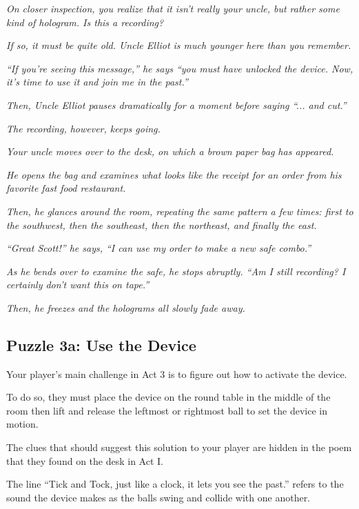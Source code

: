 \documentclass[a6paper, parskip=half, DIV=14, 12pt]{scrartcl}
\begin{document}
\textit{On closer inspection, you realize that it isn't really your uncle, but rather some kind of hologram. Is this a recording?}

\textit{If so, it must be quite old. Uncle Elliot is much younger here than you remember.}

\textit{``If you're seeing this message,'' he says ``you must have unlocked the device. Now, it's time to use it and join me in the past.''}

\textit{Then, Uncle Elliot pauses dramatically for a moment before saying ``... and cut.''}

\newpage

\textit{The recording, however, keeps going.}

\textit{Your uncle moves over to the desk, on which a brown paper bag has appeared.}

\textit{He opens the bag and examines what looks like the receipt for an order from his favorite fast food restaurant.}

\textit{Then, he glances around the room, repeating the same pattern a few times: first to the southwest, then the southeast, then the northeast, and finally the east.}

\textit{``Great Scott!'' he says, ``I can use my order to make a new safe combo.''}

\textit{As he bends over to examine the safe, he stops abruptly. ``Am I still recording? I certainly don't want this on tape.''}

\textit{Then, he freezes and the holograms all slowly fade away.}

\newpage

\subsection*{Puzzle 3a: Use the Device}

Your player's main challenge in Act 3 is to figure out how to activate the device.

To do so, they must place the device on the round table in the middle of the room then lift and release the leftmost or rightmost ball to set the device in motion.

The clues that should suggest this solution to your player are hidden in the poem that they found on the desk in Act I. 

The line ``Tick and Tock, just like a clock, it lets you see the past.'' refers to the sound the device makes as the balls swing and collide with one another.
\end{document}
